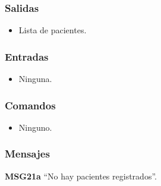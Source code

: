 \subsubsection{Salidas}
\begin{itemize}
	\item Lista de pacientes.
\end{itemize}

\subsubsection{Entradas}
\begin{itemize}
	\item Ninguna.
\end{itemize}

\subsubsection{Comandos}
\begin{itemize}
	\item Ninguno.
\end{itemize}

\subsubsection{Mensajes}
\begin{Citemize}
	\item {\bf MSG21a} ``No hay pacientes registrados''.
\end{Citemize}
